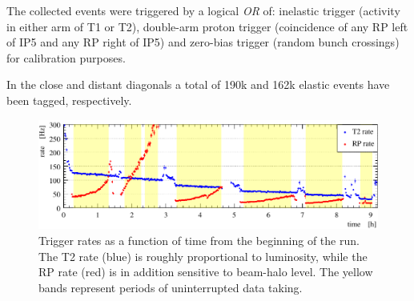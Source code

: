 The collected events were triggered by a logical \textit{OR} of: inelastic 
trigger (activity in either arm of T1 or T2), double-arm proton trigger 
(coincidence of any RP left of IP5 and any RP right of IP5) and zero-bias trigger
(random bunch crossings) for calibration purposes.

In the close and distant diagonals a total of 190k and 162k elastic events have
been tagged, respectively.


\begin{figure}
\begin{center}
\includegraphics{fig/trigger_rate.pdf}
\vskip-3mm
\caption{%
Trigger rates as a function of time from the beginning of the run. The T2 rate (blue) is roughly proportional to luminosity, while the RP rate (red) is in addition sensitive to beam-halo level. The yellow bands represent periods of uninterrupted data taking.
}
\label{fig:overview}
\end{center}
\end{figure}
